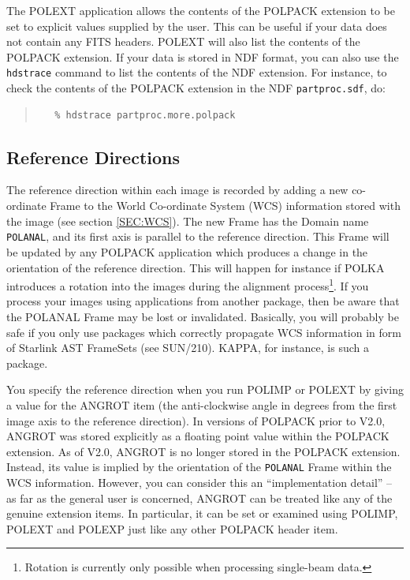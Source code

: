 \documentclass[twoside,11pt]{article}
\newcommand{\hyperref}[4]{#2\ref{#4}#3}
\newcommand{\htmlref}[2]{#1}
\newcommand{\xref}[3]{#1}
\renewcommand{\_}{\texttt{\symbol{95}}}
\newenvironment{myquote}{\begin{quote}\begin{small}}{\end{small}\end{quote}}
\begin{document}
The \htmlref{POLEXT}{POLEXT} application allows the contents of the
POLPACK extension to be set to explicit values supplied by the user. This
can be useful if your data does not contain any FITS headers. POLEXT will
also list the contents of the POLPACK extension. If your data is stored
in NDF format, you can also use the \xref{\texttt{hdstrace}}{sun102}{}
command to list the contents of the NDF extension. For instance, to check
the contents of the POLPACK extension in the NDF \verb+partproc.sdf+, do:

\begin{myquote}
\begin{verbatim}
   % hdstrace partproc.more.polpack
\end{verbatim}
\end{myquote}

\subsection{Reference Directions}
The reference direction within each image is recorded by adding a new
co-ordinate Frame to the World Co-ordinate System (WCS) information
stored with the image (see \hyperref{here}{section }{}{SEC:WCS}). The new 
Frame has the Domain name \verb+POLANAL+,
and its first axis is parallel to the reference direction. This Frame
will be updated by any POLPACK application which produces a change in the
orientation of the reference direction. This will happen
for instance if \htmlref{POLKA}{POLKA} introduces a rotation into the
images during the alignment process\footnote{Rotation is currently only
possible when processing single-beam data.}. If you process your images
using applications from another package, then be aware that the POLANAL Frame
may be lost or invalidated. Basically,
you will probably be safe if you only use packages which correctly
propagate WCS information in form of Starlink AST FrameSets (see
\xref{SUN/210}{sun210}{}). KAPPA, for instance, is such a package.

You specify the reference direction when you run POLIMP or POLEXT by
giving a value for the ANGROT item (the anti-clockwise angle in degrees
from the first image axis to the reference direction). In versions of
POLPACK prior to V2.0, ANGROT was stored explicitly as a floating point
value within the POLPACK extension. As of V2.0, ANGROT is no longer
stored in the POLPACK extension. Instead, its value is implied by the
orientation of the \verb+POLANAL+ Frame within the WCS information.
However, you can consider this an ``implementation detail'' -- as far as
the general user is concerned, ANGROT can be treated like any of the
genuine extension items. In particular, it can be set or examined using
POLIMP, POLEXT and POLEXP just like any other POLPACK header item.
\end{document}
